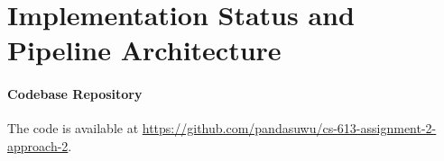 \section{Implementation Status and Pipeline Architecture}
\label{sec:implementation_status}

\paragraph{Codebase Repository}
The code is available at {\small\url{https://github.com/pandasuwu/cs-613-assignment-2-approach-2}}.
